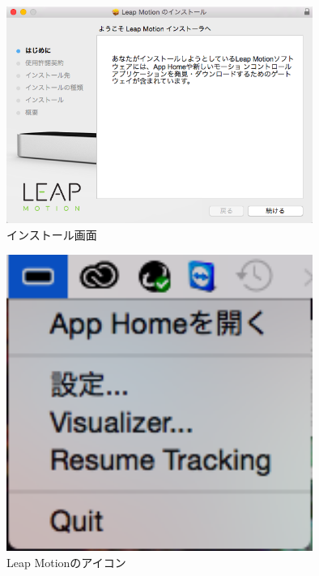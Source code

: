 \documentclass{funthesis}
\begin{document}
\begin{figure}[H]
 \begin{center}
  \includegraphics[width=100mm]{./img/installer.png}
 \end{center}
 \caption{インストール画面}
 \label{install}
\end{figure}

\begin{figure}[H]
 \begin{center}
  \includegraphics[width=100mm]{./img/setting.png}
 \end{center}
 \caption{Leap Motionのアイコン}
 \label{setting}
\end{figure}
\end{document}
